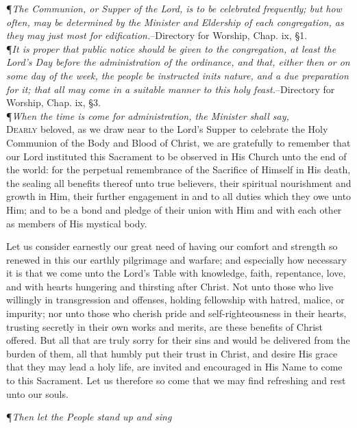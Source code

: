 \P\textit{The Communion, or Supper of the Lord, is to be celebrated frequently; but how often, may be determined by the Minister and Eldership of each congregation, as they may just most for edification.}--Directory for Worship, Chap. ix, \S 1. \\

\noindent\P\textit{It is proper that public notice should be given to the congregation, at least the Lord's Day before the administration of the ordinance, and that, either then or on some day of the week, the people be instructed inits nature, and a due preparation for it; that all may come in a suitable manner to this holy feast.}--Directory for Worship, Chap. ix, \S 3. \\

\noindent\P\textit{When the time is come for administration, the Minister shall say,} \\

\lettrine{D}{early} beloved, as we draw near to the Lord's Supper to celebrate the Holy Communion of the Body and Blood of Christ, we are gratefully to remember that our Lord instituted this Sacrament to be observed in His Church unto the end of the world: for the perpetual remembrance of the Sacrifice of Himself in His death, the sealing all benefits thereof unto true believers, their spiritual nourishment and growth in Him, their further engagement in and to all duties which they owe unto Him; and to be a bond and pledge of their union with Him and with each other as members of His mystical body.

Let us consider earnestly our great need of having our comfort and strength so renewed in this our earthly pilgrimage and warfare; and especially how necessary it is that we come unto the Lord's Table with knowledge, faith, repentance, love, and with hearts hungering and thirsting after Christ.
Not unto those who live willingly in transgression and offenses, holding fellowship with hatred, malice, or impurity; nor unto those who cherish pride and self-righteousness in their hearts, trusting secretly in their own works and merits, are these benefits of Christ offered.
But all that are truly sorry for their sins and would be delivered from the burden of them, all that humbly put their trust in Christ, and desire His grace that they may lead a holy life, are invited and encouraged in His Name to come to this Sacrament.
Let us therefore so come that we may find refreshing and rest unto our souls. \\

{\centering \P\textit{Then let the People stand up and sing}\par}


